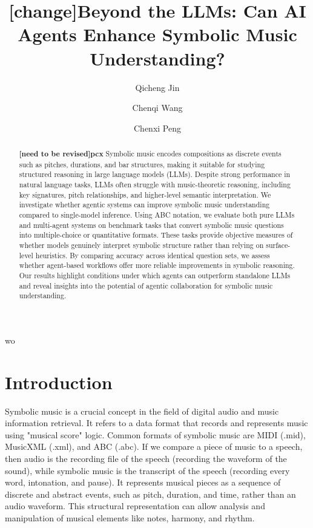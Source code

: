 wo\documentclass[sigconf]{acmart}
\title{\textbf{[change]}Beyond the LLMs: Can AI Agents Enhance Symbolic Music Understanding?}
\author{Qicheng Jin}
\affiliation{
  \institution{University or Chicago}
  \city{Chicago}
  \country{United States}
}
\author{Chenqi Wang}
\affiliation{
  \institution{University or Chicago}
  \city{Chicago}
  \country{United States}
}
\author{Chenxi Peng}
\affiliation{
  \institution{University or Chicago}
  \city{Chicago}
  \country{United States}
}
\begin{document}
\begin{abstract}
\textbf{[need to be revised]pcx}
Symbolic music encodes compositions as discrete events such as pitches, durations, and bar structures, making it suitable for studying structured reasoning in large language models (LLMs). Despite strong performance in natural language tasks, LLMs often struggle with music-theoretic reasoning, including key signatures, pitch relationships, and higher-level semantic interpretation. We investigate whether agentic systems can improve symbolic music understanding compared to single-model inference.
Using ABC notation, we evaluate both pure LLMs and multi-agent systems on benchmark tasks that convert symbolic music questions into multiple-choice or quantitative formats. These tasks provide objective measures of whether models genuinely interpret symbolic structure rather than relying on surface-level heuristics. By comparing accuracy across identical question sets, we assess whether agent-based workflows offer more reliable improvements in symbolic reasoning. Our results highlight conditions under which agents can outperform standalone LLMs and reveal insights into the potential of agentic collaboration for symbolic music understanding.
\end{abstract}


\maketitle


\section{Introduction}
Symbolic music is a crucial concept in the field of digital audio and music information retrieval. It refers to a data format that records and represents music using "musical score" logic. Common formats of symbolic music are MIDI (.mid), MusicXML (.xml), and ABC (.abc). If we compare a piece of music to a speech, then audio is the recording file of the speech (recording the waveform of the sound), while symbolic music is the transcript of the speech (recording every word, intonation, and pause). It represents musical pieces as a sequence of discrete and abstract events, such as pitch, duration, and time, rather than an audio waveform. This structural representation can allow analysis and manipulation of musical elements like notes, harmony, and rhythm. 
\end{document}
